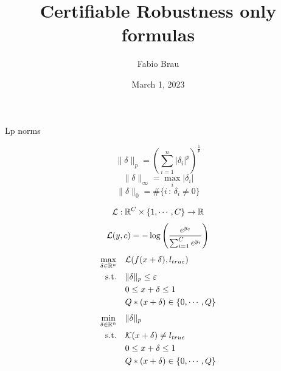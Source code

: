 \documentclass[aspectratio=169, 9pt]{beamer}
\title{Certifiable Robustness only formulas}
\date{March 1, 2023}
\author{Fabio Brau}
\institute{Scuola Superiore Sant'Anna, Pisa.}
\theoremstyle{definition}
\begin{document}
{%
\maketitle
}
\begin{frame}{Lp norms}

  \[
    \|\delta\|_p = \left( \sum_{i=1}^n |\delta_i|^p\right)^{\frac1p}
  \]
  \[
    \|\delta\|_\infty = \max_{i} |\delta_i|
  \]
  \[
    \|\delta\|_0 = \#\{i\,:\,\delta_i\ne 0\}
  \]
\end{frame}
\begin{frame}
  \[
    \mathcal{L} :\mathbb{R}^C\times \{1,\cdots,C\}\to \mathbb{R}
  \]
  \[
    \mathcal{L}(y, c) = -\log\left(\frac{e^{y_c}}{\sum_{i=1}^C e^{y_i}}\right)
  \]
  \[
    \begin{aligned}
      \max_{\delta\in\mathbb{R}^n} \quad & \mathcal{L}(f(x+\delta), l_{true})\\
      \mbox{s.t.} \quad &\|\delta\|_p\le \varepsilon \\
      & {0\le x+\delta\le 1}\\
      & {Q*(x+\delta)\in\{0,\cdots,Q\}}
    \end{aligned}
  \]
  \[
    \begin{aligned}
      \min_{\delta\in\mathbb{R}^n} \quad & \|\delta\|_p\\
      \mbox{s.t.} \quad & \mathcal{K}(x+\delta) \ne l_{true} \\
      & {0\le x+\delta\le 1}\\
      & {Q*(x+\delta)\in\{0,\cdots,Q\}}
    \end{aligned}
  \]
\end{frame}
\end{document}
